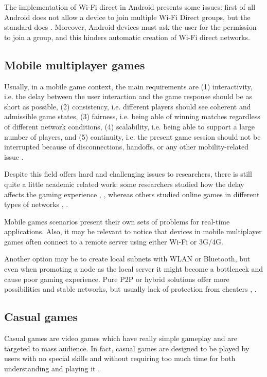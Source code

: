 The implementation of Wi-Fi direct in Android presents some issues: first of all
Android does not allow a device to join multiple Wi-Fi Direct groups,
but the standard does \cite{bib:android-wifidirect-limits}. Moreover, Android 
devices must ask the user for the permission to join a group, and this hinders 
automatic creation of Wi-Fi direct networks.

\subsection{Mobile multiplayer games}
Usually, in a mobile game context, the main requirements are (1)
interactivity, i.e. the delay between the user interaction and the game
response should be as short as possible, (2) consistency, i.e. different
players should see coherent and admissible game states, (3) fairness, i.e.
being able of winning matches regardless of different network conditions, (4)
scalability, i.e. being able to support a large number of players, and (5)
continuity, i.e. the present game session should not be interrupted because
of disconnections, handoffs, or any other mobility-related issue
\cite{bib:interactive-mobile-gaming}.

Despite this field offers hard and challenging issues to researchers, there is
still quite a little academic related work: some researchers studied how
the delay affects the gaming experience \cite{bib:impact-delay-multi},
\cite{bib:factors-multi}, whereas others studied online games in different
types of networks \cite{bib:interactive-mobile-gaming},
\cite{bib:survey-mobile-games}.

Mobile games scenarios present their own sets of problems for real-time
applications. Also, it may be relevant to notice that devices in mobile
multiplayer games often connect to a remote server using either Wi-Fi or 3G/4G.

Another option may be to create local subnets with WLAN or Bluetooth, but
even when promoting a node as the local server it might become a
bottleneck and cause poor gaming experience.
Pure P2P or hybrid solutions offer more possibilities and stable networks,
but usually lack of protection from cheaters
\cite{bib:can-mobile-gaming-be-improved}, \cite{bib:study-mobile-phone-sector}.

\subsection{Casual games}
Casual games are video games which have really simple gameplay and are
targeted to mass audience. In fact, casual games are designed to be played
by users with no special skills and without requiring too much time for both
understanding and playing it \cite{bib:mob-health-casual}.


